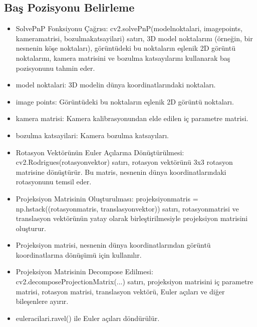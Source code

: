 \documentclass[12pt, a4paper]{article}
\begin{document}
	\subsection{ Baş Pozisyonu Belirleme }
	\begin{itemize}
		\item SolvePnP Fonksiyonu Çağrısı:
		cv2.solvePnP(modelnoktalari, imagepoints, kameramatrisi, bozulmakatsayilari) satırı, 3D model noktalarını (örneğin, bir nesnenin köşe noktaları), görüntüdeki bu noktaların eşlenik 2D görüntü noktalarını, kamera matrisini ve bozulma katsayılarını kullanarak baş pozisyonunu tahmin eder.
		
		\item model noktalari: 3D modelin dünya koordinatlarındaki noktaları.
		\item image points: Görüntüdeki bu noktaların eşlenik 2D görüntü noktaları.
		\item kamera matrisi: Kamera kalibrasyonundan elde edilen iç parametre matrisi.
		\item bozulma katsayilari: Kamera bozulma katsayıları.
		\item Rotasyon Vektörünün Euler Açılarına Dönüştürülmesi:
		cv2.Rodrigues(rotasyonvektor) satırı, rotasyon vektörünü 3x3 rotasyon matrisine dönüştürür.
		Bu matris, nesnenin dünya koordinatlarındaki rotasyonunu temsil eder.
		\item Projeksiyon Matrisinin Oluşturulması:
		projeksiyonmatris = np.hstack((rotasyonmatris, translasyonvektor)) satırı, rotasyonmatrisi ve translasyon vektörünün yatay olarak birleştirilmesiyle projeksiyon matrisini oluşturur.
		\item Projeksiyon matrisi, nesnenin dünya koordinatlarından görüntü koordinatlarına dönüşümü için kullanılır.
		\item Projeksiyon Matrisinin Decompose Edilmesi:
		cv2.decomposeProjectionMatrix(...) satırı, projeksiyon matrisini iç parametre matrisi, rotasyon matrisi, translasyon vektörü, Euler açıları ve diğer bileşenlere ayırır.
		\item euleracilari.ravel() ile Euler açıları döndürülür.\end{itemize}
\end{document}
